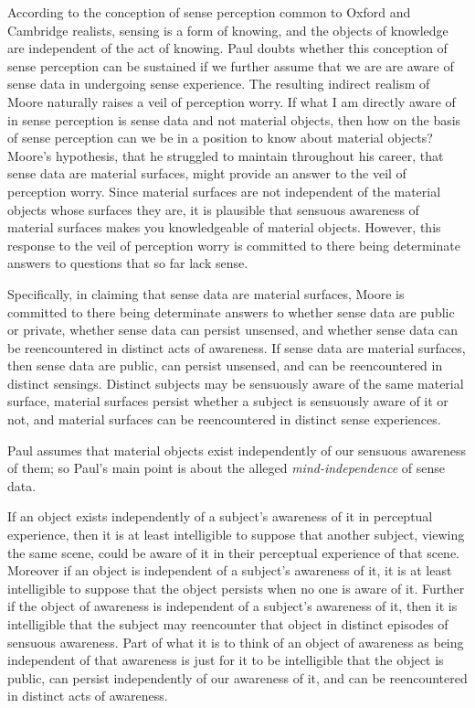 \documentclass[11pt]{article}
\begin{document}
According to the conception of sense perception common to Oxford and Cambridge realists, sensing is a form of knowing, and the objects of knowledge are independent of the act of knowing. Paul doubts whether this conception of sense perception can be sustained if we further assume that we are are aware of sense data in undergoing sense experience. The resulting indirect realism of Moore naturally raises a veil of perception worry. If what I am directly aware of in sense perception is sense data and not material objects, then how on the basis of sense perception can we be in a position to know about material objects? Moore's hypothesis, that he struggled to maintain throughout his career, that sense data are material surfaces, might provide an answer to the veil of perception worry. Since material surfaces are not independent of the material objects whose surfaces they are, it is plausible that sensuous awareness of material surfaces makes you knowledgeable of material objects. However, this response to the veil of perception worry is committed to there being determinate answers to questions that so far lack sense.

Specifically, in claiming that sense data are material surfaces, Moore is committed to there being determinate answers to whether sense data are public or private, whether sense data can persist unsensed, and whether sense data can be reencountered in distinct acts of awareness. If sense data are material surfaces, then sense data are public, can persist unsensed, and can be reencountered in distinct sensings. Distinct subjects may be sensuously aware of the same material surface, material surfaces persist whether a subject is sensuously aware of it or not, and material surfaces can be reencountered in distinct sense experiences.

Paul assumes that material objects exist independently of our sensuous awareness of them; so Paul's main point is about the alleged \emph{mind-independence} of sense data.

If an object exists independently of a subject's awareness of it in perceptual experience, then it is at least intelligible to suppose that another subject, viewing the same scene, could be aware of it in their perceptual experience of that scene. Moreover if an object is independent of a subject's awareness of it, it is at least intelligible to suppose that the object persists when no one is aware of it. Further if the object of awareness is independent of a subject's awareness of it, then it is intelligible that the subject may reencounter that object in distinct episodes of sensuous awareness. Part of what it is to think of an object of awareness as being independent of that awareness is just for it to be intelligible that the object is public, can persist independently of our awareness of it, and can be reencountered in distinct acts of awareness. 
\end{document}
